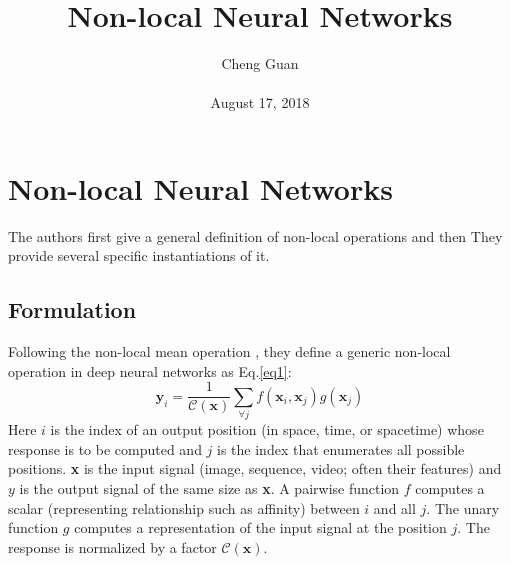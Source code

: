 \documentclass[10pt,twocolumn,letterpaper]{article}
\title{Non-local Neural Networks}
\author{Cheng Guan\\\\
August 17, 2018}
\begin{document}
\maketitle
\section{Non-local Neural Networks}
The authors first give a general definition of non-local operations
and then They provide several specific instantiations of it.
\subsection{Formulation}
Following the non-local mean operation \cite{buades2005non}, they define a
generic non-local operation in deep neural networks as Eq.\ref{eq1}:
\begin{equation}
   \textbf{y}_i = \frac{1}{\mathcal{C}\left(\textbf{x}\right)} \sum_{\forall j} f\left(\textbf{x}_i,\textbf{x}_j\right)g\left(\textbf{x}_j\right)
   \label{eq1}
\end{equation}
Here $i$ is the index of an output position (in space, time, or
spacetime) whose response is to be computed and $j$ is the
index that enumerates all possible positions. \textbf{x} is the input
signal (image, sequence, video; often their features) and $y$
is the output signal of the same size as \textbf{x}. A pairwise function $f$ computes a scalar (representing relationship such as
affinity) between $i$ and all $j$. The unary function $g$ computes
a representation of the input signal at the position $j$. The
response is normalized by a factor $\mathcal{C}\left(\textbf{x}\right)$.
\end{document}
